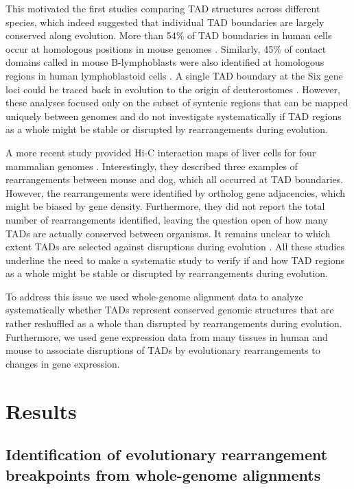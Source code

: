 \documentclass[a4paper,twoside=true,openright,parskip=full,chapterprefix=true,11pt,headings=normal,bibliography=totoc,listof=totoc,titlepage=on,captions=tableabove,draft=false]{scrreprt}
\theoremstyle{definition}
\theoremstyle{definition}
\theoremstyle{definition}
\theoremstyle{remark}
\begin{document}
This motivated the first studies comparing TAD structures across
different species, which indeed suggested that individual TAD boundaries
are largely conserved along evolution. More than 54\% of TAD boundaries
in human cells occur at homologous positions in mouse genomes
\citep{Dixon2012}. Similarly, 45\% of contact domains called in mouse
B-lymphoblasts were also identified at homologous regions in human
lymphoblastoid cells \citep{Rao2014}. A single TAD boundary at the Six
gene loci could be traced back in evolution to the origin of
deuterostomes \citep{Gomez-Marin2015}. However, these analyses focused
only on the subset of syntenic regions that can be mapped uniquely
between genomes and do not investigate systematically if TAD regions as
a whole might be stable or disrupted by rearrangements during evolution.

A more recent study provided Hi-C interaction maps of liver cells for
four mammalian genomes \citep{VietriRudan2015}. Interestingly, they
described three examples of rearrangements between mouse and dog, which
all occurred at TAD boundaries. However, the rearrangements were
identified by ortholog gene adjacencies, which might be biased by gene
density. Furthermore, they did not report the total number of
rearrangements identified, leaving the question open of how many TADs
are actually conserved between organisms. It remains unclear to which
extent TADs are selected against disruptions during evolution
\citep{Nora2013}. All these studies underline the need to make a
systematic study to verify if and how TAD regions as a whole might be
stable or disrupted by rearrangements during evolution.

To address this issue we used whole-genome alignment data to analyze
systematically whether TADs represent conserved genomic structures that
are rather reshuffled as a whole than disrupted by rearrangements during
evolution. Furthermore, we used gene expression data from many tissues
in human and mouse to associate disruptions of TADs by evolutionary
rearrangements to changes in gene expression.

\section{Results}\label{results-1}

\subsection{Identification of evolutionary rearrangement breakpoints
from whole-genome
alignments}\label{identification-of-evolutionary-rearrangement-breakpoints-from-whole-genome-alignments}
\end{document}
